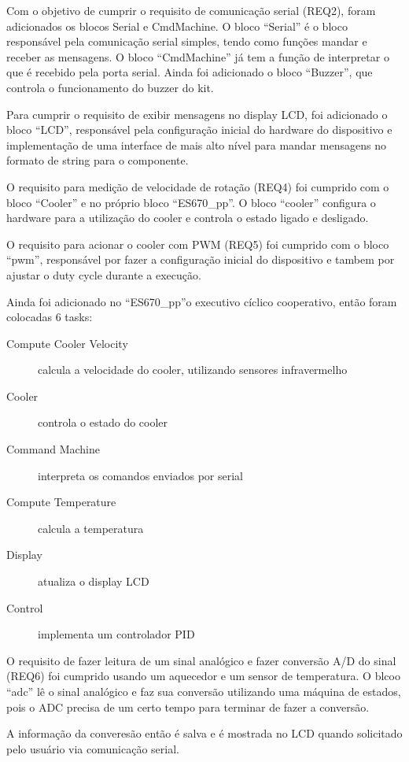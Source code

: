 \documentclass{article}
\begin{document}
Com o objetivo de cumprir o requisito de comunicação serial (REQ2), foram adicionados os blocos Serial e CmdMachine. O bloco ``Serial'' é o bloco responsável pela comunicação serial simples, tendo como funções mandar e receber as mensagens. O bloco ``CmdMachine'' já tem a função de interpretar o que é recebido pela porta serial. Ainda foi adicionado o bloco ``Buzzer'', que controla o funcionamento do buzzer do kit.

Para cumprir o requisito de exibir mensagens no display LCD, foi adicionado o bloco ``LCD'', responsável pela configuração inicial do hardware do dispositivo e implementação de uma interface de mais alto nível para mandar mensagens no formato de string para o componente.

O requisito para medição de velocidade de rotação (REQ4) foi cumprido com o bloco ``Cooler'' e no próprio bloco ``ES670\_pp''. O bloco ``cooler'' configura o hardware para a utilização do cooler e controla o estado ligado e desligado.

O requisito para acionar o cooler com PWM (REQ5) foi cumprido com o bloco ``pwm'', responsável por fazer a configuração inicial do dispositivo e tambem por ajustar o duty cycle durante a execução.

Ainda foi adicionado no ``ES670\_pp''o executivo cíclico cooperativo, então foram colocadas 6 tasks:
\begin{description}
\item[Compute Cooler Velocity] calcula a velocidade do cooler, utilizando sensores infravermelho
\item[Cooler] controla o estado do cooler
\item[Command Machine] interpreta os comandos enviados por serial
\item[Compute Temperature] calcula a temperatura
\item[Display] atualiza o display LCD
\item[Control] implementa um controlador PID
\end{description}

O requisito de fazer leitura de um sinal analógico e fazer conversão A/D do sinal (REQ6) foi cumprido usando um aquecedor e um sensor de temperatura. O blcoo ``adc'' lê o sinal analógico e faz sua conversão utilizando uma máquina de estados, pois o ADC precisa de um certo tempo para terminar de fazer a conversão.

A informação da converesão então é salva e é mostrada no LCD quando solicitado pelo usuário via comunicação serial.
\end{document}
